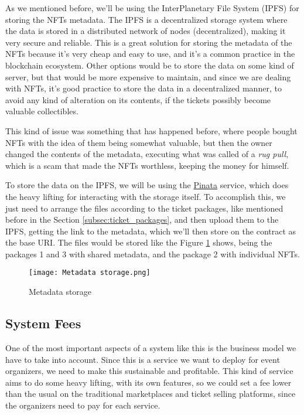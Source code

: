 As we mentioned before, we'll be using the InterPlanetary File System (IPFS) for storing the NFTs metadata. The IPFS is a decentralized storage system where the data is stored in a distributed network of nodes (decentralized), making it very secure and reliable. This is a great solution for storing the metadata of the NFTs because it's very cheap and easy to use, and it's a common practice in the blockchain ecosystem. Other options would be to store the data on some kind of server, but that would be more expensive to maintain, and since we are dealing with NFTs, it's good practice to store the data in a decentralized manner, to avoid any kind of alteration on its contents, if the tickets possibly become valuable collectibles.

This kind of issue was something that has happened before, where people bought NFTs with the idea of them being somewhat valuable, but then the owner changed the contents of the metadata, executing what was called of a \textit{rug pull}, which is a scam that made the NFTs worthless, keeping the money for himself.

To store the data on the IPFS, we will be using the \href{https://www.pinata.cloud/}{Pinata} service, which does the heavy lifting for interacting with the storage itself. To accomplish this, we just need to arrange the files according to the ticket packages, like mentioned before in the Section \ref{subsec:ticket_packages}, and then upload them to the IPFS, getting the link to the metadata, which we'll then store on the contract as the base URI. The files would be stored like the Figure \ref{fig:metadata_storage} shows, being the packages 1 and 3 with shared metadata, and the package 2 with individual NFTs.

\begin{figure}[H]
    \texttt{[image: Metadata storage.png]}
    \centering
    \caption{Metadata storage}
    \label{fig:metadata_storage}
\end{figure}

\subsection{System Fees}
\label{subsec:system_fees}

One of the most important aspects of a system like this is the business model we have to take into account. Since this is a service we want to deploy for event organizers, we need to make this sustainable and profitable. This kind of service aims to do some heavy lifting, with its own features, so we could set a fee lower than the usual on the traditional marketplaces and ticket selling platforms, since the organizers need to pay for each service.

